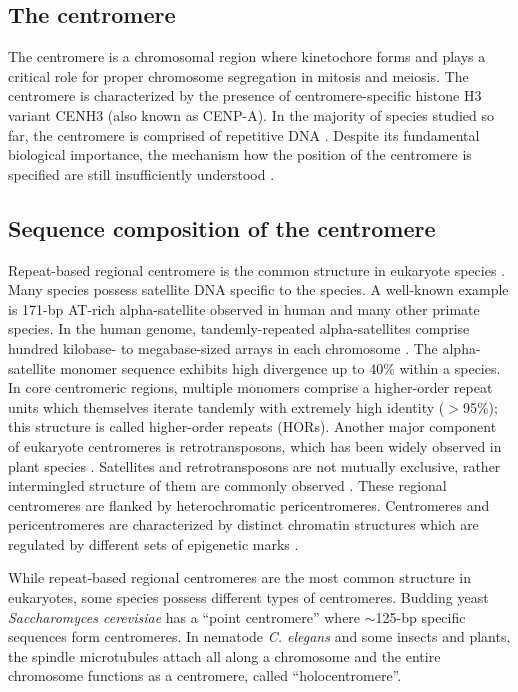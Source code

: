 \subsection*{The centromere}
  The centromere is a chromosomal region where kinetochore forms and plays a critical role for proper chromosome segregation in mitosis and meiosis. The centromere is characterized by the presence of centromere-specific histone H3 variant CENH3 (also known as CENP-A). In the majority of species studied so far, the centromere is comprised of repetitive DNA \cite{Plohl2014}. Despite its fundamental biological importance, the mechanism how the position of the centromere is specified are still insufficiently understood \cite{McKinley2016}.


\subsection*{Sequence composition of the centromere}
  Repeat-based regional centromere is the common structure in eukaryote species \cite{Plohl2014}. Many species possess satellite DNA specific to the species. A well-known example is 171-bp AT-rich alpha-satellite observed in human and many other primate species. In the human genome, tandemly-repeated alpha-satellites comprise hundred kilobase- to megabase-sized arrays in each chromosome \cite{Willard1987}. The alpha-satellite monomer sequence exhibits high divergence up to 40\% within a species. In core centromeric regions, multiple monomers comprise a higher-order repeat units which themselves iterate tandemly with extremely high identity ($>$95\%); this structure is called higher-order repeats (HORs). Another major component of eukaryote centromeres is retrotransposons, which has been widely observed in plant species \cite{Wang2009, Lermontova2015}. Satellites and retrotransposons are not mutually exclusive, rather intermingled structure of them are commonly observed \cite{Plohl2014}. These regional centromeres are flanked by heterochromatic pericentromeres. Centromeres and pericentromeres are characterized by distinct chromatin structures which are regulated by different sets of epigenetic marks \cite{Verdaasdonk2011, McKinley2016}.

  While repeat-based regional centromeres are the most common structure in eukaryotes, some species possess different types of centromeres. Budding yeast \textit{Saccharomyces cerevisiae} has a ``point centromere'' where $\sim$125-bp specific sequences form centromeres. In nematode \textit{C. elegans} and some insects and plants, the spindle microtubules attach all along a chromosome and the entire chromosome functions as a centromere, called ``holocentromere''.


